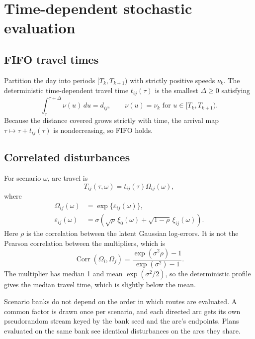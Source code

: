 \documentclass[11pt,a4paper]{article}
\begin{document}
\section{Time-dependent stochastic evaluation}

\subsection{FIFO travel times}

Partition the day into periods $[T_k,T_{k+1})$ with strictly positive speeds
$\nu_k$. The deterministic time-dependent travel time $t_{ij}(\tau)$ is the
smallest $\Delta\geq0$ satisfying
\begin{equation}
 \int_{\tau}^{\tau+\Delta}\nu(u)\,du=d_{ij},
 \qquad \nu(u)=\nu_k\text{ for }u\in[T_k,T_{k+1}).           \label{eq:fifo}
\end{equation}
Because the distance covered grows strictly with time, the arrival map
$\tau\mapsto\tau+t_{ij}(\tau)$ is nondecreasing, so FIFO holds.

\subsection{Correlated disturbances}

For scenario $\omega$, arc travel is
\begin{equation}
 T_{ij}(\tau,\omega)=t_{ij}(\tau)\Omega_{ij}(\omega),
\end{equation}
where
\begin{align}
 \Omega_{ij}(\omega)&=\exp\{\varepsilon_{ij}(\omega)\},\\
 \varepsilon_{ij}(\omega)&=\sigma\left(
 \sqrt{\rho}\,\xi_0(\omega)+\sqrt{1-\rho}\,\xi_{ij}(\omega)\right).
                                                               \label{eq:noise}
\end{align}
Here $\rho$ is the correlation between the latent Gaussian log-errors. It is
not the Pearson correlation between the multipliers, which is
\begin{equation}
 \operatorname{Corr}(\Omega_i,\Omega_j)
 =\frac{\exp(\sigma^2\rho)-1}{\exp(\sigma^2)-1}.
\end{equation}
The multiplier has median 1 and mean $\exp(\sigma^2/2)$, so the deterministic
profile gives the median travel time, which is slightly below the mean.

Scenario banks do not depend on the order in which routes are evaluated. A common
factor is drawn once per scenario, and each directed arc gets its own
pseudorandom stream keyed by the bank seed and the arc's endpoints. Plans
evaluated on the same bank see identical disturbances on the arcs they
share.
\end{document}
